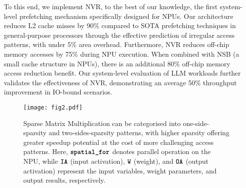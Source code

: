 

To this end, we implement NVR, to the best of our knowledge, the first system-level prefetching mechanism specifically designed for NPUs. 
Our architecture reduces L2 cache misses by 90\% compared to SOTA prefetching techniques in general-purpose processors through the effective prediction of irregular access patterns, with under 5\% area overhead. %
Furthermore, NVR reduces off-chip memory accesses by 75\% during NPU execution. When combined with NSB (a small cache structure in NPUs), there is an additional 80\% off-chip memory access reduction benefit. 
Our system-level evaluation of LLM workloads further validates the effectiveness of NVR, demonstrating an average 50\% throughput improvement in IO-bound scenarios.






\begin{figure*}[t]
\vspace{-14pt}
\hspace{-13pt}
\texttt{[image: fig2.pdf]}
\vspace{-23pt}
\caption{Sparse Matrix Multiplication can be categorised into one-side-sparsity and two-sides-sparsity patterns, with higher sparsity offering greater speedup potential at the cost of more challenging access patterns. Here, $\texttt{\textbf{spatial\_for}}$ denotes parallel operation on the NPU, while $\texttt{\textbf{IA}}$ (input activation), $\texttt{\textbf{W}}$ (weight), and $\texttt{\textbf{OA}}$ (output activation) represent the input variables, weight parameters, and output results, respectively.}
\vspace{-13pt}
\label{fig:fig2}
\end{figure*}

